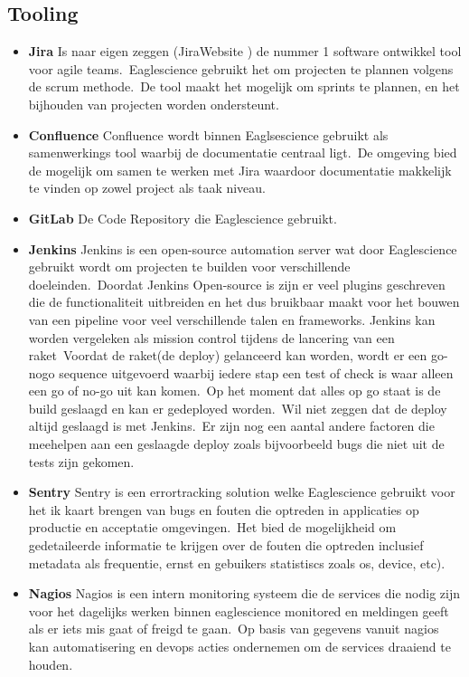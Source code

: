 \subsection{Tooling}
\begin{itemize}
\item \textbf{Jira} Is naar eigen zeggen (JiraWebsite ) de nummer 1 software ontwikkel tool voor agile teams.\ Eaglescience gebruikt het om projecten te plannen volgens de scrum methode.\ De tool maakt het mogelijk om sprints te plannen, en het bijhouden van projecten worden ondersteunt.
\item \textbf{Confluence}
Confluence wordt binnen Eaglsescience gebruikt als samenwerkings tool waarbij de documentatie centraal ligt.\ De omgeving bied de mogelijk om samen te werken met Jira waardoor documentatie makkelijk te vinden op zowel project als taak niveau.
\item \textbf{GitLab}
De Code Repository die Eaglescience gebruikt.
\item \textbf{Jenkins}
Jenkins is een open-source automation server wat door Eaglescience gebruikt wordt om projecten te builden voor verschillende doeleinden.\ Doordat Jenkins Open-source is zijn er veel plugins geschreven die de functionaliteit uitbreiden en het dus bruikbaar maakt voor het bouwen van een pipeline voor veel verschillende talen en frameworks.
Jenkins kan worden vergeleken als mission control tijdens de lancering van een raket\ Voordat de raket(de deploy) gelanceerd kan worden, wordt er een go-nogo sequence uitgevoerd waarbij iedere stap een test of check is waar alleen een go of no-go uit kan komen.\ Op het moment dat alles op go staat is de build geslaagd en kan er gedeployed worden.\ Wil niet zeggen dat de deploy altijd geslaagd is met Jenkins.\ Er zijn nog een aantal andere factoren die meehelpen aan een geslaagde deploy zoals bijvoorbeeld bugs die niet uit de tests zijn gekomen.
\item \textbf{Sentry}
Sentry is een errortracking solution welke Eaglescience gebruikt voor het ik kaart brengen van bugs en fouten die optreden in applicaties op productie en acceptatie omgevingen.\ Het bied de mogelijkheid om gedetaileerde informatie te krijgen over de fouten die optreden inclusief metadata als frequentie, ernst en gebuikers statistiscs zoals os, device, etc).
\item \textbf{Nagios}
Nagios is een intern monitoring systeem die de services die nodig zijn voor het dagelijks werken binnen eaglescience monitored en meldingen geeft als er iets mis gaat of freigd te gaan.\ Op basis van gegevens vanuit nagios kan automatisering en devops acties ondernemen om de services draaiend te houden.

\end{itemize}
